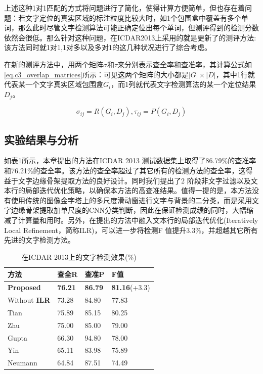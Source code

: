         上述这种1对1匹配的方式将问题进行了简化，使得计算方便简单，但也存在着问题：若文字定位的真实区域的标注粒度比较大时，如1个包围盒中覆盖有多个单词，那么此时尽管文字检测算法可能正确定位出每个单词，但测评得到的检测分数依然会很低。那么针对这种问题，在ICDAR2013上采用的就是更新了的测评方法\cite{Wolf2006Object}:该方法同时就1对1,1对多以及多对1的这几种状况进行了综合考虑。

        在新的测评方法中，用两个矩阵$\sigma$和$\tau$来分别表示查全率和查准率，其计算公式如\ref{eq.c3_overlap_matrices}所示：可见这两个矩阵的大小都是$|G|\times|D|$，其中1行就代表某一个文字真实区域包围盒$G_i$，而1列就代表文字检测算法的某一个定位结果$D_j$。

        \begin{equation}
        \sigma_{ij}=R(G_i,D_j),\tau_{ij}=P(G_i,D_j)
        \label{eq.c3_overlap_matrices}
        \end{equation}

        \subsection{实验结果与分析}

        如表\ref{tab.c3_icdar13}所示，本章提出的方法在ICDAR 2013 测试数据集上取得了86.79\%的查准率和76.21\%的查全率。该方法的查全率超过了其它所有的检测方法的查全率，这得益于文字边缘骨架提取方法的良好设计。同时我们提出了2 阶段非文字过滤以及文本行的局部迭代优化策略，以确保本方法的高查准结果。值得一提的是，本方法没有使用传统的图像金字塔上的多尺度滑动窗进行文字与背景的二分类，而是采用文字边缘骨架提取加单尺度的CNN分类判断，因此在保证检测成绩的同时，大幅缩减了计算量和用时。另外，在提出的方法中融入文本行的局部迭代优化(Iteratively Local Refinement，简称ILR)，可以进一步将检测F 值提升3.3\%，并超越其它所有先进的文字检测方法。

        \begin{table}[!h]
        \centering
        \caption{在ICDAR 2013上的文字检测效果(\%)}
        \begin{tabular}{p{}|p{} p{} p{}}
        \hline
        方法 & 查全R & 查准P & F值 \\
        \hline
        \textbf{Proposed} & \textbf{76.21} & \textbf{86.79} & \textbf{81.16}(+3.3) \\
        Without \textbf{ILR} & 73.28 & 84.80 & 77.83 \\
        \hline
        Tian\cite{Tian2016Text} & 75.89 & 85.15 & 80.25 \\
        Zhu\cite{Zhu2016Text} & 75.00 & 85.00 & 79.00 \\
        Gupta\cite{Gupta2016Synthetic} & 66.30 & 94.80 & 78.00 \\
        Yin\cite{Yin2013Robust} & 65.11 & 83.98 & 75.89 \\
        Neumann\cite{Neumann2012Real} & 64.84 & 87.51 & 74.49 \\
        \hline
        \end{tabular}
        \label{tab.c3_icdar13}
        \end{table}

